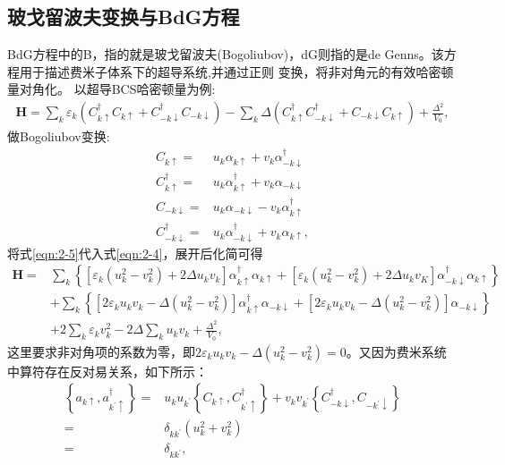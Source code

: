\documentclass[12pt, a4paper, oneside, UTF8]{ctexbook}
\begin{document}
\subsection{玻戈留波夫变换与BdG方程}
	BdG方程中的B，指的就是玻戈留波夫(Bogoliubov)，dG则指的是de Genns。该方程用于描述费米子体系下的超导系统,并通过正则
	变换，将非对角元的有效哈密顿量对角化。
	以超导BCS哈密顿量为例:
	\begin{eqnarray}
		\mathbf{H}=\sum_{k}\varepsilon_{k}(C^{\dag}_{k \uparrow} C_{k \uparrow}+C^{\dag}_{-k \downarrow} C_{-k \downarrow})-
		\sum_{k}\Delta(C^{\dag}_{k \uparrow}C^{\dag}_{-k \downarrow}+C_{-k \downarrow}C_{k \uparrow})+\frac{\Delta^2}{V_0},
		\label{eqn:2-4}	
	\end{eqnarray}
	做Bogoliubov变换:
	\begin{align}
		C_{k \uparrow} =& u_k \alpha_{k \uparrow}+v_k \alpha^{\dag}_{-k \downarrow} \nonumber\\
		C^{\dagger}_{k \uparrow} =& u_k \alpha^{\dag}_{k \uparrow}+ v_k \alpha_{-k \downarrow}\nonumber\\
		C_{-k \downarrow} =& u_k \alpha_{-k \downarrow}-v_k \alpha^{\dag}_{k \uparrow}\nonumber\\ 
		C^{\dagger}_{-k \downarrow} =& u_k \alpha^{\dag}_{-k \downarrow}+ v_k \alpha_{k \uparrow} ,
	\label{eqn:2-5}
	\end{align}
	将式\ref{eqn:2-5}代入式\ref{eqn:2-4}，展开后化简可得
	\begin{align}
		\mathbf{H}=&\sum_{k}\left\{
			\left[\varepsilon _k\left(u_k^2-v_k^2\right)+2\Delta u_k v_k\right]\alpha^{\dag}_{k \uparrow}\alpha_{k \uparrow}
			+\left[\varepsilon_k\left(u_k^2-v_k^2\right)+2\Delta u_k v_K\right]\alpha^{\dag}_{-k \downarrow}\alpha_{k \uparrow}
			\right\}\nonumber\\
			\quad&+\sum_{k}\left\{
				\left[2\varepsilon_k u_k v_k - \Delta \left(u_k^2-v_k^2\right)\right]\alpha^{\dag}_{k \uparrow}\alpha_{-k \downarrow}
				+\left[2\varepsilon_k u_k v_k- \Delta \left(u_k^2-v_k^2\right)\right]\alpha_{-k \downarrow}
			\right\}\nonumber\\
			\quad&+2\sum_k \varepsilon_k v_k^2-2\Delta \sum_k u_k v_k+\frac{\Delta^2}{V_0},
	\end{align}
	这里要求非对角项的系数为零，即$2\varepsilon_k u_k v_k-\Delta(u_k^2-v_k^2)=0$。又因为费米系统中算符存在反对易关系，如下所示：
	\begin{align}
		\left\{a_{k \uparrow},a^{\dag}_{k^{'} \uparrow}\right\}=&u_k u_{k^{'}} \left\{C_{k\uparrow},C^{\dag}_{k^{'}\uparrow}\right\}
		+v_k v_{k^{'}}\left\{C_{-k\downarrow}^{\dag},C_{-k^{'}\downarrow}\right\} \nonumber\\
		=&\delta_{kk^{'}} \left(u_k^2+v_k^2\right) \nonumber\\
		=&\delta_{kk^{'}},
	\end{align}
\end{document}
